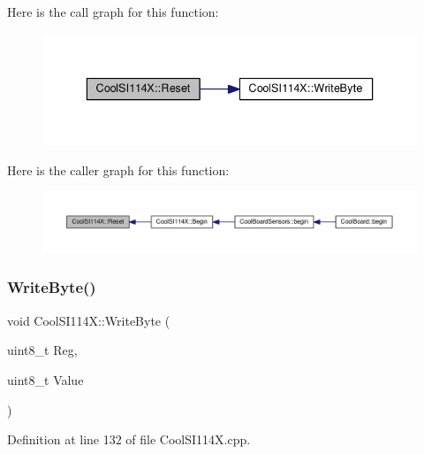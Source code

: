 Here is the call graph for this function\+:
\nopagebreak
\begin{figure}[H]
\begin{center}
\leavevmode
\includegraphics[width=336pt]{class_cool_s_i114_x_a9d9f9c9129c0c29ed497f8563f3dd823_cgraph}
\end{center}
\end{figure}
Here is the caller graph for this function\+:
\nopagebreak
\begin{figure}[H]
\begin{center}
\leavevmode
\includegraphics[width=350pt]{class_cool_s_i114_x_a9d9f9c9129c0c29ed497f8563f3dd823_icgraph}
\end{center}
\end{figure}
\mbox{\label{class_cool_s_i114_x_ac5c8dc5ade604da7a1c8cd1586feefc2}} 
\subsubsection{\texorpdfstring{Write\+Byte()}{WriteByte()}}
{\footnotesize\ttfamily void Cool\+S\+I114\+X\+::\+Write\+Byte (\begin{DoxyParamCaption}\item[{uint8\+\_\+t}]{Reg,  }\item[{uint8\+\_\+t}]{Value }\end{DoxyParamCaption})\hspace{0.3cm}{\ttfamily [private]}}



Definition at line 132 of file Cool\+S\+I114\+X.\+cpp.

